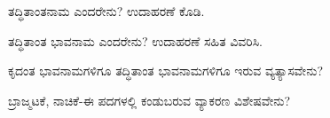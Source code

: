 \vspace{2.5pt plus 3pt minus 0.5pt}\noindent\hspace*{1.2em}\hspace{0.55em}ತದ್ಧಿತಾಂತನಾಮ ಎಂದರೇನು? ಉದಾಹರಣೆ ಕೊಡಿ.\par

\vspace{2.5pt plus 3pt minus 0.5pt}\noindent\hspace*{1.2em}\hspace{0.55em}ತದ್ಧಿತಾಂತ ಭಾವನಾಮ ಎಂದರೇನು? ಉದಾಹರಣೆ ಸಹಿತ ವಿವರಿಸಿ.\par

\vspace{2.5pt plus 3pt minus 0.5pt}\noindent\hspace*{1.2em}\hspace{0.55em}ಕೃದಂತ ಭಾವನಾಮಗಳಿಗೂ ತದ್ಧಿತಾಂತ ಭಾವನಾಮಗಳಿಗೂ ಇರುವ ವ್ಯತ್ಯಾಸವೇನು?\par

\vspace{2.5pt plus 3pt minus 0.5pt}\noindent\hspace*{1.2em}\hspace{0.55em}ಬ್ರಾಜ್ಮಟಕೆ, ನಾಚಿಕೆ-ಈ ಪದಗಳಲ್ಲಿ ಕಂಡುಬರುವ ವ್ಯಾಕರಣ ವಿಶೇಷವೇನು?\par
